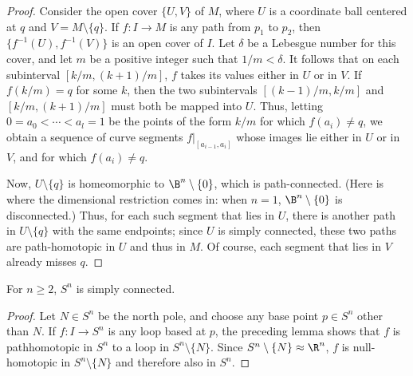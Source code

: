 \begin{proof}
Consider the open cover $\{U,V\}$ of $M$, where $U$ is a coordinate ball centered at $q$ and $V=M\setminus\{q\}$. If $f:I\to M$ is any path from $p_1$ to $p_2$, then $\{f^{-1}(U),f^{-1}(V)\}$ is an open cover of $I$. Let $\delta$ be a Lebesgue number for this cover, and let $m$ be a positive integer such that $1/m<\delta$. It follows that on each subinterval $[k/m,(k+1)/m]$, $f$ takes its values either in $U$ or in $V$. If $f(k/m)=q$
for some $k$, then the two subintervals $[(k-1)/m,k/m]$ and $[k/m,(k+1)/m]$ must both be mapped into $U$. Thus, letting $0=a_0<\cdots<a_l=1$ be the points of the form $k/m$ for which $f(a_i)\neq q$, we obtain a sequence of curve segments $f|_{[a_{i-1},a_i]}$ whose images lie either in $U$ or in $V$, and for which $f(a_i)\neq q$.\par
Now, $U\setminus\{q\}$ is homeomorphic to $\B^n\setminus\{0\}$, which is path-connected. (Here is where the dimensional restriction comes in: when $n=1$, $\B^n\setminus\{0\}$ is disconnected.) Thus, for each such segment that lies in $U$, there is another path in $U\setminus\{q\}$ with the same endpoints; since $U$ is simply connected, these two paths are path-homotopic
in $U$ and thus in $M$. Of course, each segment that lies in $V$ already misses $q$.
\end{proof}
\begin{theorem}
For $n\geq 2$, $S^n$ is simply connected.
\end{theorem}
\begin{proof}
Let $N\in S^n$ be the north pole, and choose any base point $p\in S^n$ other than $N$. If $f:I\to S^n$ is any loop based at $p$, the preceding lemma shows that $f$ is pathhomotopic in $S^n$ to a loop in $S^n\setminus\{N\}$. Since $S^n\setminus\{N\}\approx\R^n$, $f$ is null-homotopic in $S^n\setminus\{N\}$ and therefore also in $S^n$.
\end{proof}

